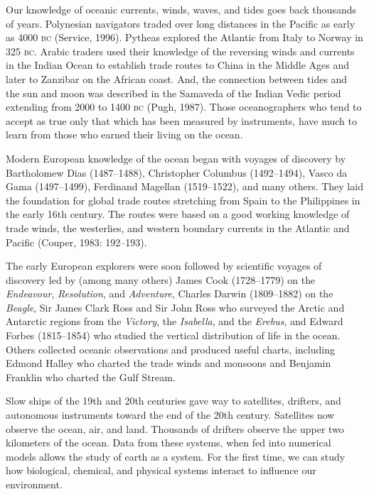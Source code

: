Our knowledge of oceanic currents, winds, waves, and tides goes back
thousands of years. Polynesian navigators traded over long distances
in the Pacific as early as 4000 \textsc{bc} (Service, 1996). Pytheas
explored the Atlantic from Italy to Norway in 325 \textsc{bc}. Arabic
traders used their knowledge of the reversing winds and currents in
the Indian Ocean to establish trade routes to China in the Middle Ages
and later to Zanzibar on the African coast. And, the connection
between tides and the sun and moon was
described in the Samaveda of the Indian Vedic period extending from
2000 to 1400 \textsc{bc} (Pugh, 1987).  Those oceanographers who tend
to accept as true only that which has been measured by instruments,
have much to learn from those who earned their living on the ocean.

Modern European knowledge of the ocean began with voyages of discovery
by Bartholomew Dias (1487--1488), Christopher Columbus (1492--1494),
Vasco da Gama (1497--1499), Ferdinand Magellan (1519--1522), and many
others. They laid the foundation for global trade routes stretching
from Spain to the Philippines in the early 16th century. The routes
were based on a good working knowledge of trade winds, the westerlies,
and western boundary currents in the Atlantic and Pacific (Couper,
1983: 192--193).

The early European explorers were soon followed by scientific voyages
of discovery led by (among many others) James Cook (1728--1779) on the
\textit{Endeavour}, \textit{Resolution}, and \textit{Adventure},
Charles Darwin (1809--1882) on the \textit{Beagle}, Sir James Clark
Ross and Sir John Ross who surveyed the Arctic and Antarctic regions
from the \textit{Victory}, the \textit{Isabella}, and the
\textit{Erebus}, and Edward Forbes (1815--1854) who studied the
vertical distribution of life in the ocean. Others collected oceanic
observations and produced useful charts, including Edmond Halley who
charted the trade winds and monsoons and Benjamin Franklin who charted
the Gulf Stream.

Slow ships of the 19th and 20th centuries gave way to satellites,
drifters, and autonomous instruments toward the end of the 20th
century. Satellites now observe the ocean, air, and land. Thousands of
drifters observe the upper two kilometers of the ocean. Data from
these systems, when fed into numerical models allows the study of
earth as a system.  For the first time, we can study how biological,
chemical, and physical systems interact to influence our environment.

